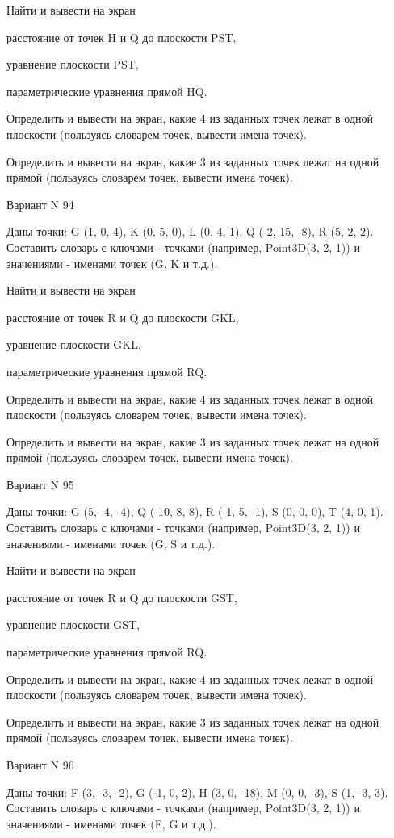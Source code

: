 \documentclass[11pt]{report}
\begin{document}
Найти и вывести на экран


расстояние от точек H и Q до плоскости PST,


уравнение плоскости PST,


параметрические уравнения прямой HQ.


Определить и вывести на экран, какие 4 из заданных точек лежат в одной плоскости (пользуясь словарем точек, вывести имена точек).


Определить и вывести на экран, какие 3 из заданных точек лежат на одной прямой (пользуясь словарем точек, вывести имена точек).

\newpage
Вариант N 94

Даны точки: G (1, 0, 4), K (0, 5, 0), L (0, 4, 1), Q (-2, 15, -8), R (5, 2, 2).
Составить словарь с ключами - точками (например, Point3D(3, 2, 1)) и значениями - именами точек (G, K и т.д.).


Найти и вывести на экран


расстояние от точек R и Q до плоскости GKL,


уравнение плоскости GKL,


параметрические уравнения прямой RQ.


Определить и вывести на экран, какие 4 из заданных точек лежат в одной плоскости (пользуясь словарем точек, вывести имена точек).


Определить и вывести на экран, какие 3 из заданных точек лежат на одной прямой (пользуясь словарем точек, вывести имена точек).

\newpage
Вариант N 95

Даны точки: G (5, -4, -4), Q (-10, 8, 8), R (-1, 5, -1), S (0, 0, 0), T (4, 0, 1).
Составить словарь с ключами - точками (например, Point3D(3, 2, 1)) и значениями - именами точек (G, S и т.д.).


Найти и вывести на экран


расстояние от точек R и Q до плоскости GST,


уравнение плоскости GST,


параметрические уравнения прямой RQ.


Определить и вывести на экран, какие 4 из заданных точек лежат в одной плоскости (пользуясь словарем точек, вывести имена точек).


Определить и вывести на экран, какие 3 из заданных точек лежат на одной прямой (пользуясь словарем точек, вывести имена точек).

\newpage
Вариант N 96

Даны точки: F (3, -3, -2), G (-1, 0, 2), H (3, 0, -18), M (0, 0, -3), S (1, -3, 3).
Составить словарь с ключами - точками (например, Point3D(3, 2, 1)) и значениями - именами точек (F, G и т.д.).
\end{document}

